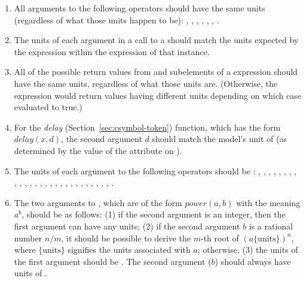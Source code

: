 \begin{enumerate}

\item All arguments to the following operators should have the same
  units (regardless of what those units happen to be):
  , , ,  ,
  , , .

\item The units of each argument in a call to a
  \FunctionDefinition should match the units expected by the
   expression within the  expression of
  that \FunctionDefinition instance.


\item All of the possible return values from  and
   subelements of a  expression
  should have the same units, regardless of what those units are.
  (Otherwise, the  expression would return values
  having different units depending on which case evaluated to
  true.)

\item For the \emph{delay} 
  (Section~\ref{sec:csymbol-token}) function, which has the form
  $delay(x, d)$, the second argument $d$ should match the model's
  unit of  (as determined by the value of the
   attribute on \Model).

\item The units of each argument to the following operators should
  be : , , ,
  , , , ,
  , , , ,
  , , , ,
  , , , ,
  , , , ,
  , , ,
  , .

\item The two arguments to , which are of the form
  $\textit{power}(a,b)$ with the meaning $a^b$, should be as
  follows: (1) if the second argument is an integer, then the
  first argument can have any units; (2) if the second argument
  $b$ is a rational number $n/m$, it should be possible to derive
  the $m$-th root of $(a \{\text{units}\})^n$, where
  $\{\text{units}\}$ signifies the units associated with $a$;
  otherwise, (3) the units of the first argument should be
  .  The second argument ($b$) should always
  have units of .


\end{enumerate}
